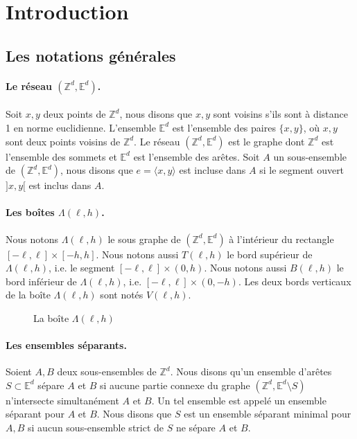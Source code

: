 \documentclass[titlepage,a4paper,12pt]{article}
\newcounter{th}
\begin{document}
\section{Introduction}
\subsection{Les notations générales}
\paragraph{Le réseau $(\mathbb{Z}^d,\mathbb{E}^d)$.} Soit $x,y$ deux points de $\mathbb{Z}^d$, nous disons que $x,y$ sont voisins s'ils sont à distance 1 en norme euclidienne. L'ensemble $\mathbb{E}^d$ est l'ensemble des paires $\{x,y\}$, où $x,y$ sont deux points voisins de $\mathbb{Z}^d$. Le réseau $(\mathbb{Z}^d, \mathbb{E}^d)$ est le graphe dont $\mathbb{Z}^d$ est l'ensemble des sommets et $\mathbb{E}^d$ est l'ensemble des arêtes. Soit $A$ un sous-ensemble de $(\mathbb{Z}^d,\mathbb{E}^d)$, nous disons que $e = \langle x,y\rangle$ est incluse dans $A$ si le segment ouvert $]x,y[$ est inclus dans $A$.

\paragraph{Les boîtes $\Lambda(\ell,h)$.} Nous notons $\Lambda(\ell,h)$ le sous graphe de $(\mathbb{Z}^d,\mathbb{E}^d)$ à l'intérieur du rectangle $[-\ell,\ell]\times[-h,h]$. Nous notons aussi $T(\ell,h)$ le bord supérieur de $\Lambda(\ell,h)$, i.e. le segment $[-\ell,\ell]\times(0,h)$. Nous notons aussi $B(\ell,h)$ le bord inférieur de $\Lambda(\ell,h)$, i.e. $[-\ell,\ell]\times(0,-h)$. Les deux bords verticaux de la boîte $\Lambda(\ell,h)$ sont notés $V(\ell,h)$.
\begin{figure}[h]
\center
{}
\caption{La boîte $\Lambda(\ell,h)$}
\end{figure}

\paragraph{Les ensembles séparants.} Soient $A,B$ deux sous-ensembles de $\mathbb{Z}^d$. Nous disons qu'un ensemble d'arêtes $S\subset \mathbb{E}^d$ sépare $A$ et $B$ si aucune partie connexe du graphe $(\mathbb{Z}^d,\mathbb{E}^d \setminus S)$ n'intersecte simultanément $A$ et $B$. Un tel ensemble est appelé un ensemble séparant pour $A$ et $B$. Nous disons que $S$ est un ensemble séparant minimal pour $A,B$ si aucun sous-ensemble strict de $S$ ne sépare $A$ et $B$.
\end{document}
